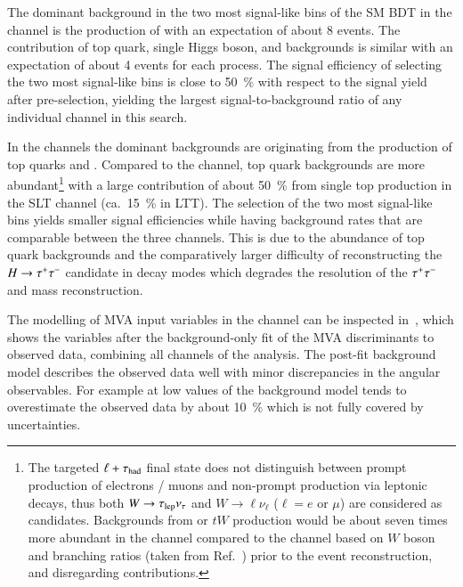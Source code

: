 The dominant background in the two most signal-like bins of the SM \HH
BDT in the \hadhad channel is the production of \ZHF with an
expectation of about 8 events. The contribution of top quark, single
Higgs boson, and \faketauhadvis backgrounds is similar with an
expectation of about 4 events for each process. The signal efficiency
of selecting the two most signal-like bins is close to
\SI{50}{\percent} with respect to the signal yield after
pre-selection, yielding the largest signal-to-background ratio of any
individual channel in this search.

In the \lephad channels the dominant backgrounds are originating from
the production of top quarks and \ZHF. Compared to the \hadhad
channel, top quark backgrounds are more abundant\footnote{The targeted
  $\ell + \tau_{\text{had}}$ final state does not distinguish between prompt
  production of electrons / muons and non-prompt production via
  leptonic \taulepton decays, thus both $W \to \tau_{\text{lep}} \nu_{\tau}$ and
  $W \to \ell \nu_{\ell}$ ($\ell = e$ or $\mu$) are considered as
  \taulepvis candidates. Backgrounds from \ttbar or $tW$ production
  would be about seven times more abundant in the \lephad channel
  compared to the \hadhad channel based on $W$ boson and \taulepton
  branching ratios (taken from Ref.~\cite{pdg2020}) prior to the event
  reconstruction, and disregarding \faketauhadvis contributions.}
with a large contribution of about \SI{50}{\percent} from single top
production in the SLT channel (ca.\ \SI{15}{\percent} in LTT). The
selection of the two most signal-like bins yields smaller signal
efficiencies while having background rates that are comparable between
the three channels. This is due to the abundance of top quark
backgrounds and the comparatively larger difficulty of reconstructing
the $H \to \tau^{+} \tau^{-}$ candidate in \lephad decay modes which degrades
the resolution of the $\tau^{+} \tau^{-}$ and \HH mass reconstruction.

The modelling of MVA input variables in the \hadhad channel can be
inspected in~, which shows the variables
after the background-only fit of the MVA discriminants to observed
data, combining all channels of the analysis. The post-fit background
model describes the observed data well with minor discrepancies in the
angular observables. For example at low values of \dRtautau the
background model tends to overestimate the observed data by about
\SI{10}{\percent} which is not fully covered by uncertainties.

